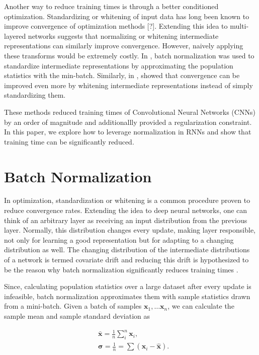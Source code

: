 \documentclass{article}
\def\x{{\mathbf x}}
\begin{document}
Another way to reduce training times is through a better conditioned optimization. Standardizing or whitening of input data has long been known to improve convergence of optimization methods [?]. Extending this idea to multi-layered networks suggests that normalizing or whitening intermediate representations can similarly improve convergence. However, naively applying these transforms would be extremely costly. In \citep{ioffe2015}, batch normalization was used to standardize intermediate representations by approximating the population statistics with the min-batch. Similarly, in \citep{desjardins2015natural}, showed that convergence can be improved even more by whitening intermediate representations instead of simply standardizing them.

These methods reduced training times of Convolutional Neural Networks (CNNs) by an order of magnitude and additionallly provided a regularization constraint. In this paper, we explore how to leverage normalization in RNNs and show that training time can be significantly reduced.

\section{Batch Normalization}

In optimization, standardization or whitening is a common procedure proven to reduce convergence rates. Extending the idea to deep neural networks, one can think of an arbitrary layer as receiving an input distribution from the previous layer. Normally, this distribution changes every update, making layer responsible, not only for learning a good representation but for adapting to a changing distribution as well. The changing distribution of the intermediate distributions of a network is termed covariate drift and reducing this drift is hypothesized to be the reason why batch normalization significantly reduces training times \citep{ioffe2015}.

Since, calculating population statistics over a large dataset after every update is infeasible, batch normalization approximates them with sample statistics drawn from a mini-batch. Given a batch of samples $\x_1, \dots \x_n$, we can calculate the sample mean and sample standard deviation as

\begin{equation}
	\begin{split}
		& \bar \x = \frac{1}{n} \sum_i^n \x_i, \\
		& \mathbf{\sigma} = \frac{1}{n} = \sum (\x_i - \hat \x).
	\end{split}
\end{equation}
\end{document}
